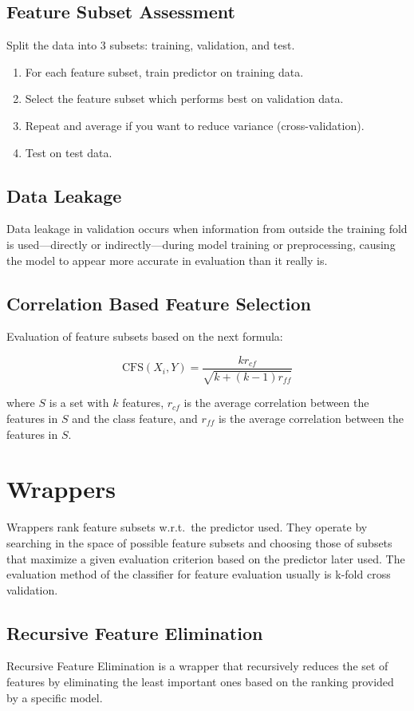 \subsection*{Feature Subset Assessment}
Split the data into 3 subsets: training, validation, and test.
\begin{enumerate}
    \item For each feature subset, train predictor on training data.
    \item Select the feature subset which performs best on validation data.
    \item Repeat and average if you want to reduce variance (cross-validation).
    \item Test on test data.
\end{enumerate}

\subsection*{Data Leakage}
Data leakage in validation occurs when information from outside the training fold is used—directly or indirectly—during model training or preprocessing, causing the model to appear more accurate in evaluation than it really is.

\subsection*{Correlation Based Feature Selection}
Evaluation of feature subsets based on the next formula:

$$\text{CFS}(X_i, Y) = \frac{kr_{cf}}{\sqrt{k + (k-1)r_{ff}}}$$

where $S$ is a set with $k$ features, $r_{cf}$ is the average correlation between the features in $S$ and the class feature, and $r_{ff}$ is the average correlation between the features in $S$.

\section*{Wrappers}
Wrappers rank feature subsets w.r.t.\ the predictor used. They operate by searching in the space of possible feature subsets and choosing those of subsets that maximize a given evaluation criterion based on the predictor later used. The evaluation method of the classifier for feature evaluation usually is k-fold cross validation.

\subsection*{Recursive Feature Elimination}
Recursive Feature Elimination is a wrapper that recursively reduces the set of features by eliminating the least important ones based on the ranking provided by a specific model.


